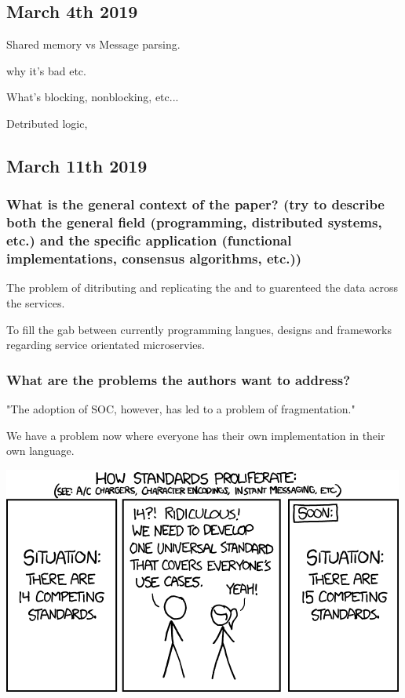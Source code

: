 \documentclass[a4paper,10pt,titlepage]{report}
\begin{document}
\subsection{March 4th 2019}

Shared memory vs Message parsing. 

why it's bad etc.

What's blocking, nonblocking, etc...


Detributed logic,  

\newpage
\subsection{March 11th 2019}

\subsubsection{What is the general context of the paper? (try to describe both
the general field (programming, distributed systems, etc.) and the specific
application (functional implementations, consensus algorithms, etc.))}

The problem of ditributing and replicating the and to guarenteed the data across the services.

To fill the gab between currently programming langues, designs and frameworks regarding service orientated microservies.

\subsubsection{What are the problems the authors want to address?}

"The adoption of SOC, however, has led to a problem of fragmentation."

We have a problem now where everyone has their own implementation in their own language.

\includegraphics[scale=0.5]{standards.png}
\end{document}
